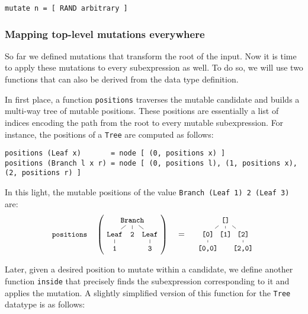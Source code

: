\documentclass[acmsmall, anonymous]{acmart}
\begin{document}
\begin{verbatim}
mutate n = [ RAND arbitrary ]
\end{verbatim}


\subsubsection{Mapping top-level mutations everywhere}

So far we defined mutations that transform the root of the input.
%
Now it is time to apply these mutations to every subexpression as well.
%
To do so, we will use two functions that can also be derived from the data type
definition.


In first place, a function \texttt{positions} traverses the mutable candidate
and builds a multi-way tree of mutable positions.
%
These positions are essentially a list of indices encoding the path from the
root to every mutable subexpression.
%
For instance, the positions of a \texttt{Tree} are computed as follows:

\begin{verbatim}
positions (Leaf x)       = node [ (0, positions x) ]
positions (Branch l x r) = node [ (0, positions l), (1, positions x), (2, positions r) ]
\end{verbatim}

\noindent In this light, the mutable positions of the value \texttt{Branch (Leaf 1) 2 (Leaf 3)} are:
%
\begin{equation}
  \nonumber
  {\small \texttt{positions}}\quad
  \left(
  \tikz[
    baseline=-7mm,
    level distance=0.6cm,
    level 1/.style={sibling distance=0.75cm},
    level 2/.style={sibling distance=0.75cm}
  ]{
    \node {\small \texttt{Branch}}
      child {node {\small \texttt{Leaf}}
        child {node {\small \texttt{1}}}
      }
      child {node {\small \texttt{2}}}
      child {node {\small \texttt{Leaf}}
        child {node {\small \texttt{3}}}
      };
  }
  \right)
  \quad
  =
  \quad
  \tikz[
    baseline=-7mm,
    level distance=0.6cm,
    level 1/.style={sibling distance=0.75cm},
    level 2/.style={sibling distance=0.75cm}
  ]{
    \node {\texttt{\small []}}
      child {node {\small \texttt{[0]}}
        child {node {\small \texttt{[0,0]}}}
      }
      child {node {\small \texttt{[1]}}}
      child {node {\small \texttt{[2]}}
        child {node {\small \texttt{[2,0]}}}
      };
  }
\end{equation}

\noindent Later, given a desired position to mutate within a candidate, we
define another function \texttt{inside} that precisely finds the subexpression
corresponding to it and applies the mutation.
%
A slightly simplified version of this function for the \texttt{Tree} datatype is
as follows:
\end{document}
